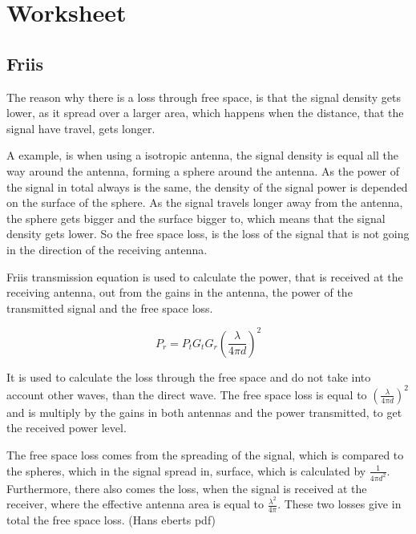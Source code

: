 \chapter{Worksheet}
\section{Friis}

The reason why there is a loss through free space, is that the signal density gets lower, as it spread over a larger area, which happens when the distance, that the signal have travel, gets longer. 

A example, is when using a isotropic antenna, the signal density is equal all the way around the antenna, forming a sphere around the antenna. As the power of the signal in total always is the same, the density of the signal power is depended on the surface of the sphere. As the signal travels longer away from the antenna, the sphere gets bigger and the surface bigger to, which means that the signal density gets lower. So the free space loss, is the loss of the signal that is not going in the direction of the receiving antenna.


Friis transmission equation is used to calculate the power, that is received at the receiving antenna, out from the gains in the antenna, the power of the transmitted signal and the free space loss. 

\begin{equation}
P_r = P_t G_t G_r (\frac{\lambda}{4 \pi d})^2
\end{equation}
\begin{where}
\end{where}

It is used to calculate the loss through the free space and do not take into account other waves, than the direct wave. The free space loss is equal to $(\frac{\lambda}{4 \pi d})^2$ and is multiply by the gains in both antennas and the power transmitted, to get the received power level.

The free space loss comes from the spreading of the signal, which is compared to the spheres, which in the signal spread in, surface, which is calculated by $\frac{1}{4 \pi d^2}$. Furthermore, there also comes the loss, when the signal is received at the receiver, where the effective antenna area is equal to $\frac{\lambda^2}{4 \pi}$. These two losses give in total the free space loss. (Hans eberts pdf)


